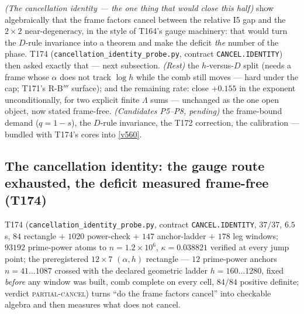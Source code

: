\documentclass[11pt,a4paper]{article}
\begin{document}
\begin{keybox}
\emph{(The cancellation identity --- the one thing that would close
this half)} show algebraically that the frame factors cancel between
the relative I5 gap and the $2\times2$ near-degeneracy, in the style of
T164's gauge machinery: that would turn the $D$-rule invariance into a
theorem and make the deficit \emph{the} number of the phase. T174
(\texttt{cancellation\_identity\_probe.py}, contract
\texttt{CANCEL.IDENTITY}) then asked exactly that --- next subsection.
\emph{(Rest)} the $h$-versus-$D$
split (needs a frame whose $\alpha$ does not track $\log h$ while the
comb still moves --- hard under the cap; T171's R-B$'''$ surface); and
the remaining rate: close $+0.155$ in the exponent unconditionally, for
two explicit finite $\Lambda$ sums --- unchanged as the one open
object, now stated frame-free. \emph{(Candidates P5--P8, pending)} the
frame-bound demand ($q=1-s$), the $D$-rule invariance, the T172
correction, the calibration --- bundled with T174's cores into
\vref{v560}.
\end{keybox}

\subsection{The cancellation identity: the gauge route exhausted, the
deficit measured frame-free (T174)}\label{sec:t174}
T174 (\texttt{cancellation\_identity\_probe.py}, contract
\texttt{CANCEL.IDENTITY}, $37/37$, $6.5$\,s, $84$ rectangle $+$ $1020$
power-check $+$ $147$ anchor-ladder $+$ $178$ leg windows; $93192$
prime-power atoms to $n=1.2\times10^{6}$, $\kappa=0.038821$ verified at
every jump point; the preregistered $12\times7$ $(\alpha,h)$ rectangle
--- $12$ prime-power anchors $n=41\ldots1087$ crossed with the declared
geometric ladder $h=160\ldots1280$, fixed \emph{before} any window was
built, comb complete on every cell, $84/84$ positive definite; verdict
\textsc{partial-cancel}) turns ``do the frame factors cancel'' into
checkable algebra and then measures what does not cancel.
\end{document}

